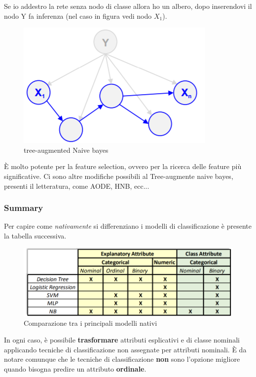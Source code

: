 Se io addestro la rete senza nodo di classe allora ho un albero, dopo inserendovi il nodo Y fa inferenza (nel caso in figura vedi nodo $X_1$).

\begin{figure}[H]
	\centering
	\includegraphics[height=0.35 \linewidth]{classification/pict/treenaivebayes.png}
	\caption{tree-augmented Naive bayes}
\end{figure}

\`E molto potente per la feature selection, ovvero per la ricerca delle feature più significative. 
Ci sono altre modifiche possibili al Tree-augmente naive bayes, presenti il letteratura, come AODE, HNB, ecc... 

\subsubsection{Summary}
Per capire come \textit{nativamente} si differenziano i modelli di classificazione è presente la  tabella successiva. 

\begin{figure}[H]
	\centering
	\includegraphics[height=0.3 \linewidth]{classification/pict/class_tecniques.png}
	\caption{Comparazione tra i principali modelli nativi}
\end{figure}

In ogni caso, è possibile \textbf{trasformare} attributi esplicativi e di classe nominali applicando tecniche di classificazione non assegnate per attributi nominali. \`E da notare comunque che le tecniche di classificazione \textbf{non} sono l'opzione migliore quando bisogna predire un attributo \textbf{ordinale}.

